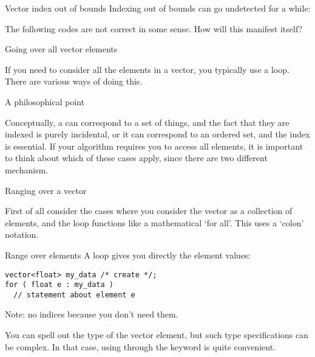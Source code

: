 \begin{block}{Vector index out of bounds}
  Indexing out of bounds can go undetected for a while:
  
\end{block}

\begin{review}
  The following codes are not correct in some sense. How will this manifest itself?
\end{review}

 {Going over all vector elements}
\label{sec:arrayrange}

If you need to consider all the elements in a vector, you typically
use a  loop. There are various ways of doing this.

\begin{block}{A philosophical point}
  \label{sl:vector-access-types}

  Conceptually, a  can correspond to a set of things,
  and the fact that they are indexed is purely incidental,
  or it can correspond to an ordered set,
  and the index is essential.
  If your algorithm requires you to access all elements,
  it is important to think about which of these cases apply,
  since there are two different mechanism.
\end{block}

 {Ranging over a vector}

First of all consider the cases where you consider the vector as a
collection of elements, and the loop functions like a mathematical
`for all'.
This uses a `colon' notation.

\begin{block}{Range over elements}
  \label{sl:vector-range1}
  A  loop
  gives you directly the element values:
\begin{lstlisting}
vector<float> my_data /* create */;
for ( float e : my_data )
  // statement about element e
\end{lstlisting}
Note: no indices because you don't need them.
\end{block}

You can spell out the type of the vector element, but such type
specifications can be complex.
In that case, using 
through the  keyword
is quite convenient.

